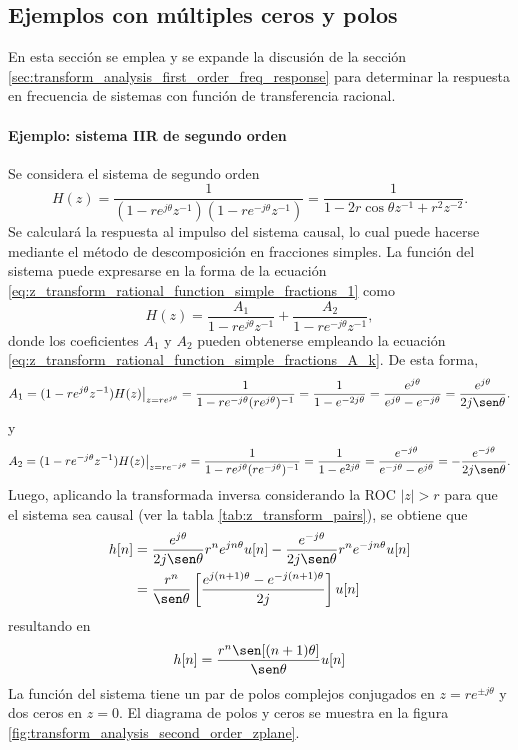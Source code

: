 \documentclass[a4paper]{report}
\begin{document}
\subsection{Ejemplos con múltiples ceros y polos}

En esta sección se emplea y se expande la discusión de la sección \ref{sec:transform_analysis_first_order_freq_response} para determinar la respuesta en frecuencia de sistemas con función de transferencia racional.

\paragraph{Ejemplo: sistema IIR de segundo orden}

Se considera el sistema de segundo orden
\[
 H(z)=\frac{1}{(1-re^{j\theta}z^{-1})(1-re^{-j\theta}z^{-1})}
  =\frac{1}{1-2r\cos\theta z^{-1}+r^2z^{-2}}.
\]
Se calculará la respuesta al impulso del sistema causal, lo cual puede hacerse mediante el método de descomposición en fracciones simples. La función del sistema puede expresarse en la forma de la ecuación \ref{eq:z_transform_rational_function_simple_fractions_1} como
\[
 H(z)=\frac{A_1}{1-re^{j\theta}z^{-1}}+\frac{A_2}{1-re^{-j\theta}z^{-1}},
\]
donde los coeficientes \(A_1\) y \(A_2\) pueden obtenerse empleando la ecuación \ref{eq:z_transform_rational_function_simple_fractions_A_k}. De esta forma, 
\[
 A_1=(1-re^{j\theta}z^{-1})H(z)\big|_{z=re^{j\theta}}
  =\frac{1}{1-re^{-j\theta}(re^{j\theta})^{-1}}
  =\frac{1}{1-e^{-2j\theta}}
  =\frac{e^{j\theta}}{e^{j\theta}-e^{-j\theta}}
  =\frac{e^{j\theta}}{2j\sen\theta}.
\]
y
\[
 A_2=(1-re^{-j\theta}z^{-1})H(z)\big|_{z=re^{-j\theta}}
  =\frac{1}{1-re^{j\theta}(re^{-j\theta})^{-1}}
  =\frac{1}{1-e^{2j\theta}}
  =\frac{e^{-j\theta}}{e^{-j\theta}-e^{j\theta}}
  =-\frac{e^{-j\theta}}{2j\sen\theta}.
\]
Luego, aplicando la transformada inversa considerando la ROC \(|z|>r\) para que el sistema sea causal (ver la tabla \ref{tab:z_transform_pairs}), se obtiene que 
\begin{align*}
 h[n]&=\frac{e^{j\theta}}{2j\sen\theta}r^ne^{jn\theta}u[n]-\frac{e^{-j\theta}}{2j\sen\theta}r^ne^{-jn\theta}u[n]\\
  &=\frac{r^n}{\sen\theta}\left[\frac{e^{j(n+1)\theta}-e^{-j(n+1)\theta}}{2j}\right]u[n]
\end{align*}
resultando en
\[
 h[n]=\frac{r^n\sen[(n+1)\theta]}{\sen\theta}u[n]
\]
La función del sistema tiene un par de polos complejos conjugados en \(z=re^{\pm j\theta}\) y dos ceros en \(z=0\). El diagrama de polos y ceros se muestra en la figura \ref{fig:transform_analysis_second_order_zplane}. 
\end{document}
